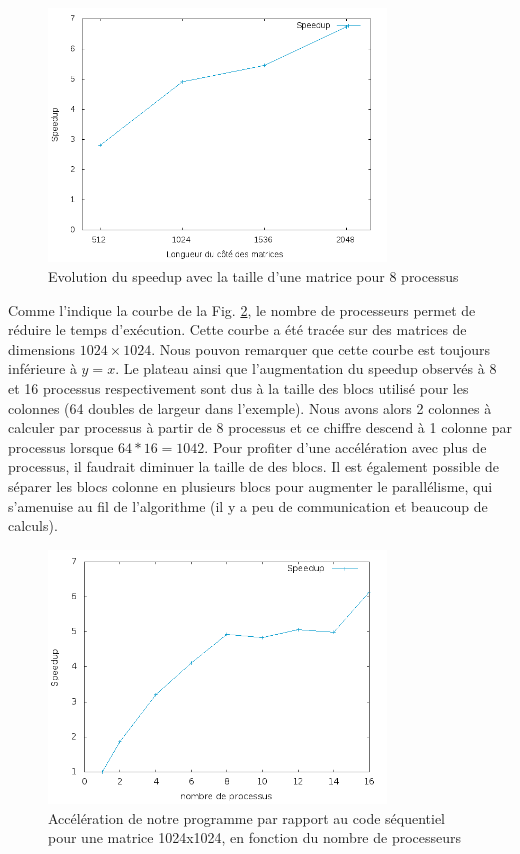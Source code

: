 \begin{figure}[H]
\centering
\includegraphics[width=0.8\textwidth]{sp-size.png}
\caption{Evolution du speedup avec la taille d'une matrice pour 8 processus}
\label{fig:sp-size}
\end{figure}

Comme l'indique la courbe de la Fig. \ref{fig:sp-proc}, le nombre de processeurs permet de réduire le temps d'exécution. Cette courbe a été tracée sur des matrices de dimensions $1024\times1024$. Nous pouvon remarquer que cette courbe est toujours inférieure à $y = x$. Le plateau ainsi que l'augmentation du speedup observés à 8 et 16 processus respectivement sont dus à la taille des blocs utilisé pour les colonnes (64 doubles de largeur dans l'exemple). Nous avons alors 2 colonnes à calculer par processus à partir de 8 processus et ce chiffre descend à 1 colonne par processus lorsque $64*16 = 1042$. Pour profiter d'une accélération avec plus de processus, il faudrait diminuer la taille de des blocs. Il est également possible de séparer les blocs colonne en plusieurs blocs pour augmenter le parallélisme, qui s'amenuise au fil de l'algorithme (il y a peu de communication et beaucoup de calculs).

\begin{figure}[H]
\centering
\includegraphics[width=0.8\textwidth]{sp-proc.png}
\caption{Accélération de notre programme par rapport au code séquentiel pour une matrice 1024x1024, en fonction du nombre de processeurs}
\label{fig:sp-proc}
\end{figure}

